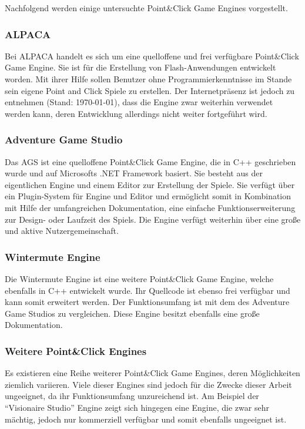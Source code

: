 Nachfolgend werden einige untersuchte Point\&Click Game Engines vorgestellt.\\

\subsubsection{ALPACA}
Bei ALPACA \cite{AlpacaOnline} handelt es sich um eine quelloffene und frei verfügbare Point\&Click Game Engine.
Sie ist für die Erstellung von Flash-Anwendungen entwickelt worden. 
Mit ihrer Hilfe sollen Benutzer ohne Programmierkenntnisse im Stande sein eigene Point and Click Spiele zu erstellen.
Der Internetpräsenz ist jedoch zu entnehmen (Stand: \today), dass die Engine zwar weiterhin verwendet werden kann, deren Entwicklung allerdings nicht weiter fortgeführt wird.\\


\subsubsection{Adventure Game Studio}
Das \acf{AGS} ist eine quelloffene Point\&Click Game Engine, die in C++ geschrieben wurde und auf Microsofts .NET Framework basiert.
Sie besteht aus der eigentlichen Engine und einem Editor zur Erstellung der Spiele. 
Sie verfügt über ein Plugin-System für Engine und Editor und ermöglicht somit in Kombination mit Hilfe der umfangreichen Dokumentation, 
eine einfache Funktionserweiterung zur Design- oder Laufzeit des Spiels. 
Die Engine verfügt weiterhin über eine große und aktive Nutzergemeinschaft.\\

\subsubsection{Wintermute Engine}
Die Wintermute Engine ist eine weitere Point\&Click Game Engine, welche ebenfalls in C++ entwickelt wurde.
Ihr Quellcode ist ebenso frei verfügbar und kann somit erweitert werden. 
Der Funktionsumfang ist mit dem des Adventure Game Studios zu vergleichen.
Diese Engine besitzt ebenfalls eine große Dokumentation. \\

\subsubsection{Weitere Point\&Click Engines}
Es existieren eine Reihe weiterer Point\&Click Game Engines, deren Möglichkeiten ziemlich variieren. 
Viele dieser Engines sind jedoch für die Zwecke dieser Arbeit ungeeignet, da ihr Funktionsumfang unzureichend ist.
Am Beispiel der "`Visionaire Studio"' Engine  zeigt sich hingegen eine Engine, die zwar sehr mächtig, jedoch nur kommerziell verfügbar und somit ebenfalls ungeeignet ist.\\\\


